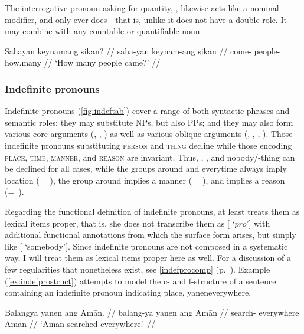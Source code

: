 \xe

The interrogative pronoun asking for quantity, , likewise acts like a nominal modifier, and only ever does---that is,
unlike  it does not have a double role. It may combine with
any countable or quantifiable noun:

\ex\begingl
\gla Sahayan keynamang sikan? //
\glb saha-yan keynam-ang sikan //
\glc come-\TplM{} people-\Aarg{} how.many //
\glft `How many people came?' //
\endgl\xe

\subsubsection{Indefinite pronouns}

Indefinite pronouns (\autoref{fig:indeftab}) cover a range of both syntactic
phrases and semantic roles: they may substitute NPs, but also PPs; and they may
also form various core arguments (\Subj{}, \Obj{}, ) as well as
various oblique arguments (, , , ).
Those indefinite pronouns substituting \textsc{person} and \textsc{thing}
decline while those encoding \textsc{place}, \textsc{time}, \textsc{manner},
and \textsc{reason} are invariant. Thus, , , and
 {nobody/\mbox{-thing}} can be declined for all cases, while
the groups around  and 
{everytime} always imply location (=~\Loc{}), the group around
 implies a manner (=~\Ins{}), and
 implies a reason (=~\Caus{}).

Regarding the functional definition of indefinite pronouns, at least
\citet{dalrymple2001} treats them as lexical items proper, that is, she does
not transcribe them as [\Pred{} `$pro$'] with additional functional annotations
from which the surface form arises, but simply like [\Pred{} `somebody']. Since
indefinite pronouns are not composed in a systematic way, I will treat them as
lexical items proper here as well. For a discussion of a few regularities that
nonetheless exist, see \autoref{indefprocomp} (p.~\pageref{indefprocomp}).
Example (\ref{ex:indefprostruct}) attempts to model the c- and f-structure of a
sentence containing an indefinite pronoun indicating place, 
{yanen}{everywhere}.

\ex\label{ex:indefprostruct}
\begingl
	\gla Balangya yanen ang Amān. //
	\glb balang-ya yanen ang Amān //
	\glc search-\TsgM{} everywhere \Aarg{} Amān //
	\glft `Amān searched everywhere.' //
\endgl\medskip

